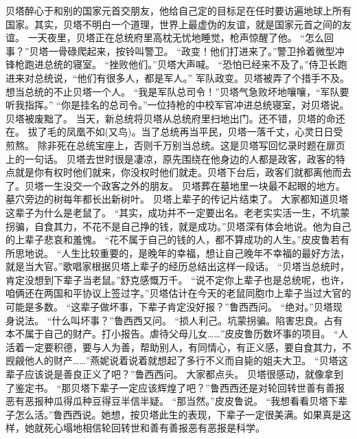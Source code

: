 \documentclass[a4paper,12pt,UTF8,twoside]{ctexbook}
\begin{document}
        贝塔醉心于和别的国家元首交朋友，他给自己定的目标足在任时要访遍地球上所有国家。其实，贝塔不明白一个道理，世界上最虚伪的友谊，就是国家元首之间的友谊。  
        一天夜里，贝塔正在总统府里高枕无忧地睡觉，枪声惊醒了他。  
        “怎么回事？”贝塔一骨碌爬起来，按铃叫警卫。  
        “政变！他们打进来了。”警卫拎着微型冲锋枪跑进总统的寝室。  
        “挫败他们。”贝塔大声喊。  
        “恐怕已经来不及了。”侍卫长跑进来对总统说，“他们有很多人，都是军人。”  
        军队政变。贝塔被弄了个措手不及。  
        想当总统的不止贝塔一个人。  
        “我是军队总司令！”贝塔气急败坏地嚷嚷，“军队要听我指挥。”  
        “你是挂名的总司令。”一位持枪的中校军官冲进总统寝室，对贝塔说。  
        贝塔被废黜了。  
        当天，新总统将贝塔从总统府里扫地出门。还不错，贝塔的命还在。  
        拔了毛的凤凰不如(又鸟)。当了总统再当平民，贝塔一落千丈，心灵日日受煎熬。  
        除非死在总统宝座上，否则千万别当总统。这是贝塔写回忆录时题在扉页上的一句话。  
        贝塔去世时很是凄凉，原先围绕在他身边的人都是政客，政客的特点就是你有权时他们就来，你没权时他们就走。贝塔下台后，政客们就都离他而去了。贝塔一生没交一个政客之外的朋友。  
        贝塔葬在墓地里一块最不起眼的地方。墓穴旁边的树每年都长出新树叶。  
        贝塔上辈子的传记片结束了。  
        大家都知道贝塔这辈子为什么是老鼠了。  
        “其实，成功并不一定要出名。老老实实活一生，不坑蒙拐骗，自食其力，不花不是自己挣的钱，就是成功。”贝塔深有体会地说。他为自己的上辈子悲哀和羞愧。  
        “花不属于自己的钱的人，都不算成功的人生。”皮皮鲁若有所思地说。  
        “人生比较重要的，是晚年的幸福，想让自己晚年不幸福的最好方法，就是当大官。”歌唱家根据贝塔上辈子的经历总结出这样一段话。  
        “贝塔当总统时，肯定没想到下辈子当老鼠。”舒克感慨万千。  
        “说不定你上辈子也是总统呢，也许，咱俩还在两国和平协议上签过字。”贝塔估计在今天的老鼠同胞巾上辈子当过大官的可能是多数。  
        “这辈子做坏事，下辈子肯定没好报？”鲁西西问。  
        “绝对。”贝塔现身说法。  
        “什么叫坏事？”鲁西西又问。  
        “损人利己。坑蒙拐骗。陷害忠良。占有本不属于自己的财产。打小报告。虐待父母儿女……”皮皮鲁历数坏事的项目。  
        “人活着一定要积德，要与人为善，帮助别人，有同情心，有正义感，要自食其力，不觊觎他人的财产……”燕妮说着说着就想起了多行不义而自毙的姐夫大卫。  
        “贝塔这辈子应该说是善良正义了吧？”鲁西西问。  
        大家都点头。  
        贝塔很感动，就像拿到了鉴定书。  
        “那贝塔下辈子一定应该辉煌了吧？”鲁西西还是对轮回转世善有善报恶有恶报种瓜得瓜种豆得豆半信半疑。  
        “那当然。”皮皮鲁说。  
        “我想看看贝塔下辈子怎么活。”鲁西西说。她想，按贝塔此生的表现，下辈子一定很美满。如果真是这样，她就死心塌地相信轮回转世和善有善报恶有恶报是科学。        
\end{document}

